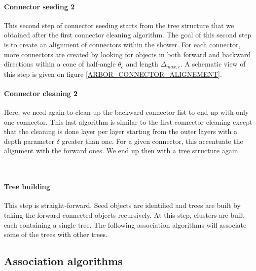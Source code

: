 \documentclass[cits]{JINST}
\begin{document}
\paragraph*{Connector seeding 2} This second step of connector seeding starts from the tree structure that we obtained after the first connector cleaning algorithm. The goal of this second step is to create an alignment of connectors within the shower. For each connector, more connectors are created by looking for objects in both forward and backward directions within a cone of half-angle $\theta_c$ and length $\Delta_{max,c}$. A schematic view of this step is given on figure \ref{ARBOR_CONNECTOR_ALIGNEMENT}.

\paragraph*{Connector cleaning 2} Here, we need again to clean-up the backward connector list to end up with only one connector. This last algorithm is similar to the first connector cleaning except that the cleaning is done layer per layer starting from the outer layers with a depth parameter $\delta$ greater than one. For a given connector, this accentuate the alignment with the forward ones. We end up then with a tree structure again.

~ \\
\paragraph*{Tree building} This step is straight-forward. Seed objects are identified and trees are built by taking the forward connected objects recursively. At this step, clusters are built each containing a single tree. The following association algorithms will associate some of the trees with other trees.

\subsection{Association algorithms} 
\end{document}
